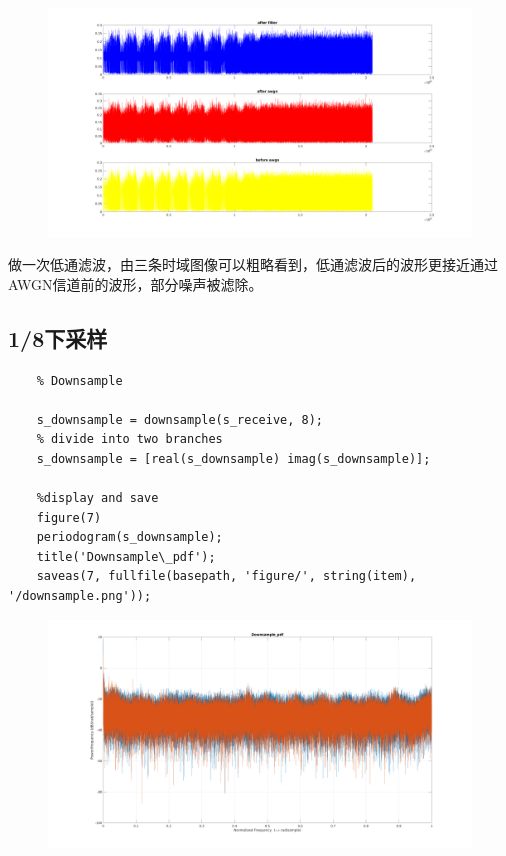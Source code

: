 \begin{spacing}{1.5}
\begin{figure}[H]
\centering
\includegraphics[width = \columnwidth]{matchedfilter.png}
\end{figure}

做一次低通滤波，由三条时域图像可以粗略看到，低通滤波后的波形更接近通过AWGN信道前的波形，部分噪声被滤除。

\subsection{1/8下采样}

\begin{lstlisting}
    % Downsample

    s_downsample = downsample(s_receive, 8);
    % divide into two branches
    s_downsample = [real(s_downsample) imag(s_downsample)];
    
    %display and save
    figure(7)
    periodogram(s_downsample);
    title('Downsample\_pdf');
    saveas(7, fullfile(basepath, 'figure/', string(item), '/downsample.png'));
\end{lstlisting}

\begin{figure}[H]
\centering
\includegraphics[width = \columnwidth]{downsample.png}
\end{figure}


\end{spacing}
